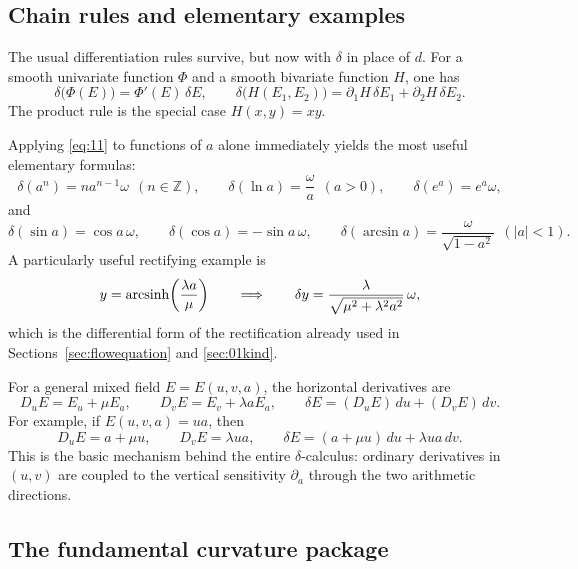 \subsection{Chain rules and elementary examples}

The usual differentiation rules survive, but now with $\delta$ in place of $d$.
For a smooth univariate function $\Phi$ and a smooth bivariate function $H$, one has
\begin{equation}\label{eq:11}\tag{11}
\delta\bigl(\Phi(E)\bigr)=\Phi'(E)\,\delta E,
\qquad
\delta\bigl(H(E_1,E_2)\bigr)=\partial_1H\,\delta E_1+\partial_2H\,\delta E_2.
\end{equation}
The product rule is the special case $H(x,y)=xy$.

Applying \eqref{eq:11} to functions of $a$ alone immediately yields the most useful elementary formulas:
\begin{equation}\label{eq:13}\tag{13}
\delta(a^n)=n a^{n-1}\omega\ \ (n\in\mathbb{Z}),
\qquad
\delta(\ln a)=\frac{\omega}{a}\ \ (a>0),
\qquad
\delta(e^a)=e^a\omega,
\end{equation}
and
\begin{equation}\label{eq:14}\tag{14}
\delta(\sin a)=\cos a\,\omega,
\qquad
\delta(\cos a)=-\sin a\,\omega,
\qquad
\delta(\arcsin a)=\frac{\omega}{\sqrt{1-a^2}}\ \ (|a|<1).
\end{equation}
A particularly useful rectifying example is
\[
y=\operatorname{arcsinh}\!\left(\frac{\lambda a}{\mu}\right)
\qquad\Longrightarrow\qquad
\delta y=\frac{\lambda}{\sqrt{\mu^2+\lambda^2a^2}}\,\omega,
\]
which is the differential form of the rectification already used in Sections~\ref{sec:flowequation} and \ref{sec:01kind}.

For a general mixed field $E=E(u,v,a)$, the horizontal derivatives are
\begin{equation}\label{eq:15}\tag{15}
D_uE=E_u+\mu E_a,
\qquad
D_vE=E_v+\lambda a E_a,
\qquad
\delta E=(D_uE)\,du+(D_vE)\,dv.
\end{equation}
For example, if $E(u,v,a)=ua$, then
\[
D_uE=a+\mu u,
\qquad
D_vE=\lambda ua,
\qquad
\delta E=(a+\mu u)\,du+\lambda ua\,dv.
\]
This is the basic mechanism behind the entire $\delta$-calculus: ordinary derivatives in $(u,v)$ are coupled to the vertical sensitivity $\partial_a$ through the two arithmetic directions.

\subsection{The fundamental curvature package}

